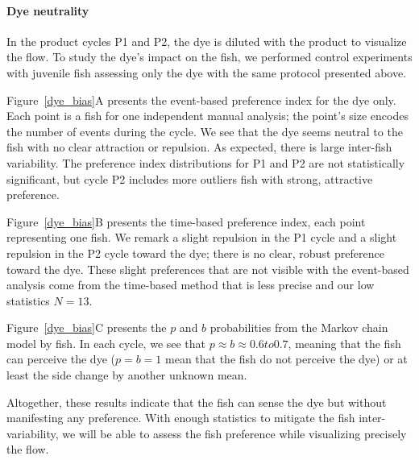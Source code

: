   \paragraph{Dye neutrality} In the product cycles P1 and P2, the dye is diluted with the product to visualize the flow. To study the dye's impact on the fish, we performed control experiments with juvenile fish assessing only the dye with the same protocol presented above.

  Figure~\ref{dye_bias}A presents the event-based preference index for the dye only. Each point is a fish for one independent manual analysis; the point's size encodes the number of events during the cycle. We see that the dye seems neutral to the fish with no clear attraction or repulsion. As expected, there is large inter-fish variability. The preference index distributions for P1 and P2 are not statistically significant, but cycle P2 includes more outliers fish with strong, attractive preference.

  Figure~\ref{dye_bias}B presents the time-based preference index, each point representing one fish. We remark a slight repulsion in the P1 cycle and a slight repulsion in the P2 cycle toward the dye; there is no clear, robust preference toward the dye. These slight preferences that are not visible with the event-based analysis come from the time-based method that is less precise and our low statistics $N=13$.

  Figure~\ref{dye_bias}C presents the $p$ and $b$ probabilities from the Markov chain model by fish. In each cycle, we see that $p \approx b \approx 0.6 to 0.7$, meaning that the fish can perceive the dye ($ p = b = 1$ mean that the fish do not perceive the dye) or at least the side change by another unknown mean.

  Altogether, these results indicate that the fish can sense the dye but without manifesting any preference. With enough statistics to mitigate the fish inter-variability, we will be able to assess the fish preference while visualizing precisely the flow.


